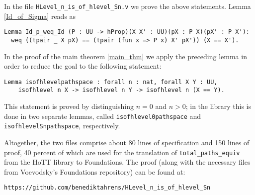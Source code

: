 \documentclass[11pt]{amsart}
\theoremstyle{plain}
\theoremstyle{definition}
\begin{document}
In the file {\verb+HLevel_n_is_of_hlevel_Sn.v+} we prove the above statements.
Lemma \ref{Id_of_Sigma} reads as
\begin{lstlisting}
Lemma Id_p_weq_Id (P : UU -> hProp)(X X' : UU)(pX : P X)(pX' : P X'): 
  weq ((tpair _ X pX) == (tpair (fun x => P x) X' pX')) (X == X').
\end{lstlisting}
In the proof of the main theorem \ref{main_thm} we apply the preceding lemma in order to 
reduce the goal to the following statement:
\begin{lstlisting}
Lemma isofhlevelpathspace : forall n : nat, forall X Y : UU,
    isofhlevel n X -> isofhlevel n Y -> isofhlevel n (X == Y).
\end{lstlisting}
This statement is proved by distinguishing $n = 0$ and $n > 0$; in the library this is done in 
two separate lemmas, called \lstinline!isofhlevel0pathspace! and \lstinline!isofhlevelSnpathspace!,
respectively.

Altogether, the two files comprise about 80 lines of specification and 150 lines of proof, 40 percent of which
are used for the translation of \lstinline!total_paths_equiv! from the \textsf{HoTT} library to 
\textsf{Foundations}.
The proof (along with the necessary files from Voevodsky's Foundations repository) can be found at:
\begin{center}
 \texttt{https://github.com/benediktahrens/HLevel\_n\_is\_of\_hlevel\_Sn}
\end{center}



\end{document}
